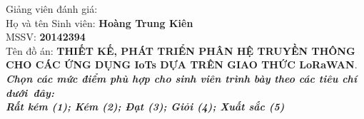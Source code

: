 %
%
\thispagestyle{plain}
\begin{center}
\Large{}
\end{center}
Giảng viên đánh giá: \dotline[4pt]{12cm}\\
Họ và tên Sinh viên:\hspace{3.33cm} \textbf{Hoàng Trung Kiên}\\
MSSV:\hspace{6.7cm} \textbf{20142394}\\
Tên đồ án:     \textbf {THIẾT KẾ, PHÁT TRIỂN PHÂN HỆ TRUYỀN THÔNG CHO CÁC ỨNG DỤNG IoTs DỰA TRÊN GIAO THỨC LoRaWAN}.\\
\emph{\textbf{Chọn các mức điểm phù hợp cho sinh viên trình bày theo các tiêu chí dưới~đây:\\
Rất kém (1); Kém (2); Đạt (3); Giỏi (4); Xuất sắc (5)}} \\

